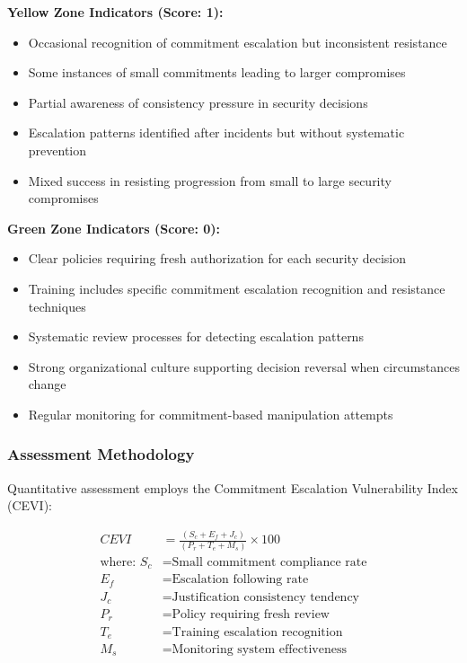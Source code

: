 \documentclass[11pt,a4paper]{article}
\begin{document}
\textbf{Yellow Zone Indicators (Score: 1):}
\begin{itemize}
\item Occasional recognition of commitment escalation but inconsistent resistance
\item Some instances of small commitments leading to larger compromises
\item Partial awareness of consistency pressure in security decisions
\item Escalation patterns identified after incidents but without systematic prevention
\item Mixed success in resisting progression from small to large security compromises
\end{itemize}

\textbf{Green Zone Indicators (Score: 0):}
\begin{itemize}
\item Clear policies requiring fresh authorization for each security decision
\item Training includes specific commitment escalation recognition and resistance techniques
\item Systematic review processes for detecting escalation patterns
\item Strong organizational culture supporting decision reversal when circumstances change
\item Regular monitoring for commitment-based manipulation attempts
\end{itemize}

\subsubsection{Assessment Methodology}

Quantitative assessment employs the Commitment Escalation Vulnerability Index (CEVI):

\begin{align}
CEVI &= \frac{(S_c + E_f + J_c)}{(P_r + T_e + M_s)} \times 100 \\
\text{where: } S_c &= \text{Small commitment compliance rate} \\
E_f &= \text{Escalation following rate} \\
J_c &= \text{Justification consistency tendency} \\
P_r &= \text{Policy requiring fresh review} \\
T_e &= \text{Training escalation recognition} \\
M_s &= \text{Monitoring system effectiveness}
\end{align}
\end{document}
